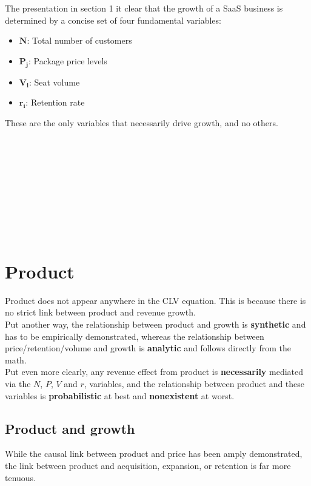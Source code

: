 \documentclass{article}
\begin{document}
The presentation in section 1 it clear that the growth of a SaaS business is determined by a concise set of four fundamental variables:

\begin{itemize}
  \item \(\bm{N}\): Total number of customers
  \item \(\bm{P_j}\): Package price levels
  \item \(\bm{V_i}\): Seat volume
  \item \(\bm{r_i}\): Retention rate
\end{itemize}

These are the only variables that necessarily drive growth, and no others. \\ \\ \\ \\ \\ \\ \\ \\ \\ \\





\section{Product}

Product does not appear anywhere in the CLV equation. This is because there is no strict link between product and revenue growth.  \\

Put another way, the relationship between product and growth is \textbf{synthetic} and has to be empirically demonstrated, whereas the relationship between price/retention/volume and growth is \textbf{analytic} and follows directly from the math. \\
 
Put even more clearly, any revenue effect from product is \textbf{necessarily} mediated via the $N$, $P$, $V$ and $r$, variables, and the relationship between product and these variables is \textbf{probabilistic} at best and \textbf{nonexistent} at worst.  \\


\subsection{Product and growth}
While the causal link between product and price has been amply demonstrated, the link between product and acquisition, expansion, or retention is far more tenuous. \\
\end{document}
